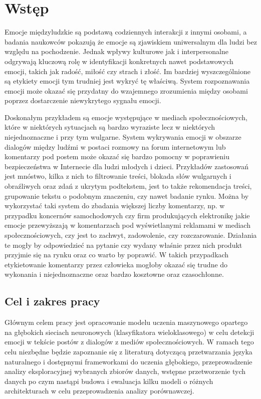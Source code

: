 \chapter{Wstęp}

Emocje międzyludzkie są podstawą codziennych interakcji z innymi osobami, a badania naukowców pokazują że emocje są zjawiskiem uniwersalnym dla ludzi bez względu na pochodzenie. Jednak wpływy kulturowe jak i interpersonalne odgrywają kluczową rolę w identyfikacji konkretnych nawet podstawowych emocji, takich jak radość, miłość czy strach i złość. Im bardziej wyszczególnione są etykiety emocji tym trudniej jest wykryć tę właściwą. System rozpoznawania emocji może okazać się przydatny do wzajemnego zrozumienia między osobami poprzez dostarczenie niewykrytego sygnału emocji. 

Doskonałym przykładem są emocje występujące w mediach społecznościowych, które w niektórych sytuacjach są bardzo wyraziste lecz w niektórych niejednoznaczne i przy tym wulgarne. System wykrywania emocji w obszarze dialogów między ludźmi w postaci rozmowy na forum internetowym lub komentarzy pod postem może okazać się bardzo pomocny w poprawieniu bezpieczeństwa w Internecie dla ludzi młodych i dzieci. Przykładów zastosowań jest mnóstwo, kilka z nich to filtrowanie treści, blokada słów wulgarnych i obraźliwych oraz zdań z ukrytym podtekstem, jest to także rekomendacja treści, grupowanie tekstu o podobnym znaczeniu, czy nawet badanie rynku. Można by wykorzystać taki system do zbadania większej liczby komentarzy, np. w przypadku koncernów samochodowych czy firm produkujących elektronikę jakie emocje przewyższają w komentarzach pod wyświetlanymi reklamami w mediach społecznościowych, czy jest to zachwyt, zadowolenie, czy rozczarowanie. Działania te mogły by odpowiedzieć na pytanie czy wydany właśnie przez nich produkt przyjmie się na rynku oraz co warto by poprawić. W takich przypadkach etykietowanie komentarzy przez człowieka mogłoby okazać się trudne do wykonania i niejednoznaczne oraz bardzo kosztowne oraz czasochłonne.

\section{Cel i zakres pracy}

Głównym celem pracy jest opracowanie modelu uczenia maszynowego opartego na głębokich sieciach neuronowych (klasyfikatora wieloklasowego) w celu detekcji emocji w tekście postów z dialogów z mediów społecznościowych. W ramach tego celu niezbędne będzie zapoznanie się z literaturą dotyczącą przetwarzania języka naturalnego i dostępnymi frameworkami do uczenia głębokiego, przeprowadzenie analizy eksploracyjnej wybranych zbiorów danych, wstępne przetworzenie tych danych po czym nastąpi budowa i ewaluacja kilku modeli o różnych architekturach w celu przeprowadzenia analizy porównawczej.


